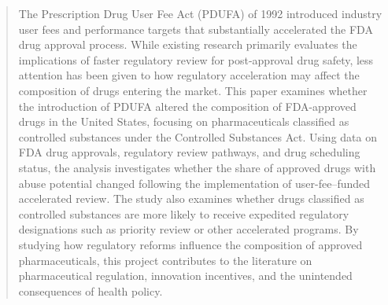 \begin{abstract}

The Prescription Drug User Fee Act (PDUFA) of 1992 introduced industry user fees and performance targets that substantially accelerated the FDA drug approval process. While existing research primarily evaluates the implications of faster regulatory review for post-approval drug safety, less attention has been given to how regulatory acceleration may affect the composition of drugs entering the market. This paper examines whether the introduction of PDUFA altered the composition of FDA-approved drugs in the United States, focusing on pharmaceuticals classified as controlled substances under the Controlled Substances Act. Using data on FDA drug approvals, regulatory review pathways, and drug scheduling status, the analysis investigates whether the share of approved drugs with abuse potential changed following the implementation of user-fee–funded accelerated review. The study also examines whether drugs classified as controlled substances are more likely to receive expedited regulatory designations such as priority review or other accelerated programs. By studying how regulatory reforms influence the composition of approved pharmaceuticals, this project contributes to the literature on pharmaceutical regulation, innovation incentives, and the unintended consequences of health policy.

\end{abstract}
